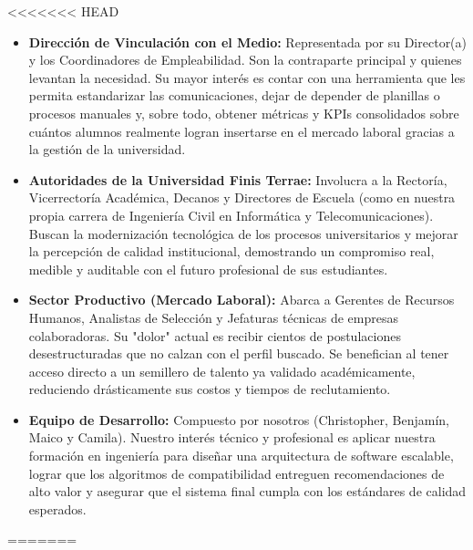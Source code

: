 \documentclass[11pt,a4paper]{Plantilla}
\begin{document}
<<<<<<< HEAD
\begin{itemize}
    \item \textbf{Dirección de Vinculación con el Medio:} Representada por su Director(a) y los Coordinadores de Empleabilidad. Son la contraparte principal y quienes levantan la necesidad. Su mayor interés es contar con una herramienta que les permita estandarizar las comunicaciones, dejar de depender de planillas o procesos manuales y, sobre todo, obtener métricas y KPIs consolidados sobre cuántos alumnos realmente logran insertarse en el mercado laboral gracias a la gestión de la universidad.
    
    \vspace{0.2cm}
    
    \item \textbf{Autoridades de la Universidad Finis Terrae:} Involucra a la Rectoría, Vicerrectoría Académica, Decanos y Directores de Escuela (como en nuestra propia carrera de Ingeniería Civil en Informática y Telecomunicaciones). Buscan la modernización tecnológica de los procesos universitarios y mejorar la percepción de calidad institucional, demostrando un compromiso real, medible y auditable con el futuro profesional de sus estudiantes.
    
    \vspace{0.2cm}
    
    \item \textbf{Sector Productivo (Mercado Laboral):} Abarca a Gerentes de Recursos Humanos, Analistas de Selección y Jefaturas técnicas de empresas colaboradoras. Su "dolor" actual es recibir cientos de postulaciones desestructuradas que no calzan con el perfil buscado. Se benefician al tener acceso directo a un semillero de talento ya validado académicamente, reduciendo drásticamente sus costos y tiempos de reclutamiento.
    
    \vspace{0.2cm}
    
    \item \textbf{Equipo de Desarrollo:} Compuesto por nosotros (Christopher, Benjamín, Maico y Camila). Nuestro interés técnico y profesional es aplicar nuestra formación en ingeniería para diseñar una arquitectura de software escalable, lograr que los algoritmos de compatibilidad entreguen recomendaciones de alto valor y asegurar que el sistema final cumpla con los estándares de calidad esperados.
\end{itemize}
=======
\end{document}

